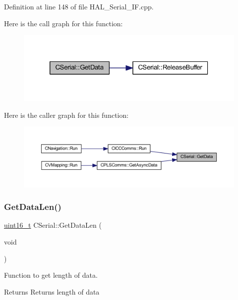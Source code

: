 Definition at line 148 of file H\+A\+L\+\_\+\+Serial\+\_\+\+I\+F.\+cpp.

Here is the call graph for this function\+:
\nopagebreak
\begin{figure}[H]
\begin{center}
\leavevmode
\includegraphics[width=320pt]{class_c_serial_abad86c07f530569b2ceeea75bda485ad_cgraph}
\end{center}
\end{figure}
Here is the caller graph for this function\+:
\nopagebreak
\begin{figure}[H]
\begin{center}
\leavevmode
\includegraphics[width=350pt]{class_c_serial_abad86c07f530569b2ceeea75bda485ad_icgraph}
\end{center}
\end{figure}
\mbox{\label{class_c_serial_a4327d6041fe9a390612b214709027cbb}} 
\subsubsection{\texorpdfstring{GetDataLen()}{GetDataLen()}}
{\footnotesize\ttfamily \mbox{\hyperlink{_a_d_a_s___types_8h_a1f1825b69244eb3ad2c7165ddc99c956}{uint16\+\_\+t}} C\+Serial\+::\+Get\+Data\+Len (\begin{DoxyParamCaption}\item[{void}]{ }\end{DoxyParamCaption})}



Function to get length of data. 

\begin{DoxyReturn}{Returns}
Returns length of data 
\end{DoxyReturn}


